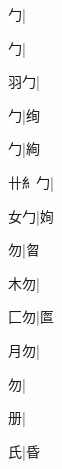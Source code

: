 \begin{multicols}{2}
{{勹}\mktsJzrVerticalBar{}{\cjk{}{\cnsym{}　}{\cnsym{}　}{\cnsym{}　}}|{}\par
{勹}\mktsJzrVerticalBar{}{\cjk{}{\cnsym{}　}{\cnsym{}　}{\cnsym{}　}}|{}\par
{\cjk{}{\cnsym{}　}羽勹}\mktsJzrVerticalBar{}{\cjk{}{\cnsym{}　}{\cnsym{}　}{\cnsym{}　}}|{}\par
{勹}\mktsJzrVerticalBar{}{\cjk{}{\cnsym{}　}{\cnsym{}　}{\cnsym{}　}}|{\cjk{}绚}\par
{勹}\mktsJzrVerticalBar{}{\cjk{}{\cnsym{}　}{\cnsym{}　}{\cnsym{}　}}|{\cjk{}絢}\par
{\cjk{}卄{糹}勹}\mktsJzrVerticalBar{}{\cjk{}{\cnsym{}　}{\cnsym{}　}{\cnsym{}　}}|{}\par
{\cjk{}{\cnsym{}　}女勹}\mktsJzrVerticalBar{}{\cjk{}{\cnsym{}　}{\cnsym{}　}{\cnsym{}　}}|{\cjk{}姰}\par
{\cjk{}{\cnsym{}　}{\cnsym{}　}勿}\mktsJzrVerticalBar{}{\cjk{}{\cnsym{}　}{\cnsym{}　}{\cnsym{}　}}|{\cjk{}曶}\par
{\cjk{}{\cnsym{}　}木勿}\mktsJzrVerticalBar{}{\cjk{}{\cnsym{}　}{\cnsym{}　}{\cnsym{}　}}|{}\par
{\cjk{}{\cnsym{}　}匚勿}\mktsJzrVerticalBar{}{\cjk{}{\cnsym{}　}{\cnsym{}　}{\cnsym{}　}}|{\cjk{}匫}\par
{\cjk{}{\cnsym{}　}月勿}\mktsJzrVerticalBar{}{\cjk{}{\cnsym{}　}{\cnsym{}　}{\cnsym{}　}}|{}\par
{勿}\mktsJzrVerticalBar{}{\cjk{}{\cnsym{}　}{\cnsym{}　}{\cnsym{}　}}|{}\par
{\cjk{}{\cnsym{}　}{\cnsym{}　}册}\mktsJzrVerticalBar{}{\cjk{}{\cnsym{}　}{\cnsym{}　}{\cnsym{}　}}|{}\par
{\cjk{}{\cnsym{}　}{\cnsym{}　}氏}\mktsJzrVerticalBar{}{\cjk{}{\cnsym{}　}{\cnsym{}　}{\cnsym{}　}}|{\cjk{}昏}\par
}
\end{multicols}
